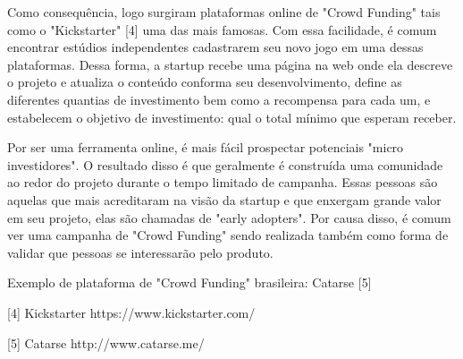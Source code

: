 Como consequência, logo surgiram plataformas online de "Crowd Funding" tais como o "Kickstarter" [4] uma das mais famosas. Com essa facilidade, é comum encontrar estúdios independentes cadastrarem seu novo jogo em uma dessas plataformas. Dessa forma, a startup recebe uma página na web onde ela descreve o projeto e atualiza o conteúdo conforma seu desenvolvimento, define as diferentes quantias de investimento bem como a recompensa para cada um, e estabelecem o objetivo de investimento: qual o total mínimo que esperam receber.

Por ser uma ferramenta online, é mais fácil prospectar potenciais "micro investidores". O resultado disso é que geralmente é construída uma comunidade ao redor do projeto durante o tempo limitado de campanha. Essas pessoas são aquelas que mais acreditaram na visão da startup e que enxergam grande valor em seu projeto, elas são chamadas de "early adopters". Por causa disso, é comum ver uma campanha de "Crowd Funding" sendo realizada também como forma de validar que pessoas se interessarão pelo produto.

Exemplo de plataforma de "Crowd Funding" brasileira: Catarse [5]

[4] Kickstarter
https://www.kickstarter.com/

[5] Catarse
http://www.catarse.me/
